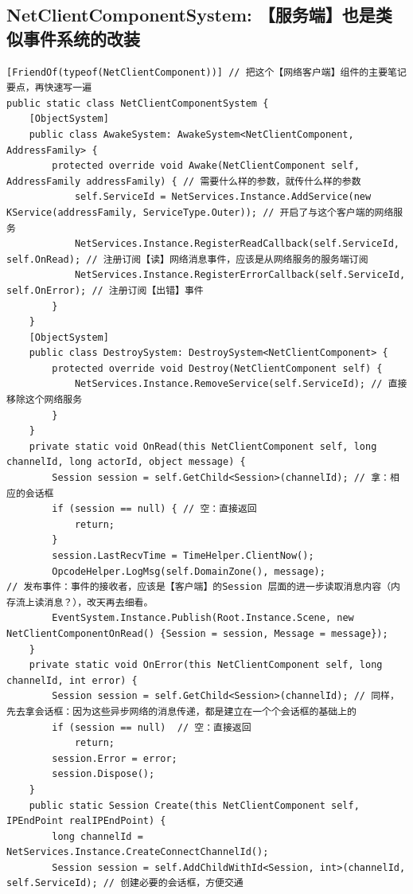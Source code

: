 \documentclass[9pt, b5paper]{article}
\begin{document}
\subsection{NetClientComponentSystem: 【服务端】也是类似事件系统的改装}
\label{sec-3-8}
\begin{verbatim}
[FriendOf(typeof(NetClientComponent))] // 把这个【网络客户端】组件的主要笔记要点，再快速写一遍
public static class NetClientComponentSystem {
    [ObjectSystem]
    public class AwakeSystem: AwakeSystem<NetClientComponent, AddressFamily> {
        protected override void Awake(NetClientComponent self, AddressFamily addressFamily) { // 需要什么样的参数，就传什么样的参数
            self.ServiceId = NetServices.Instance.AddService(new KService(addressFamily, ServiceType.Outer)); // 开启了与这个客户端的网络服务
            NetServices.Instance.RegisterReadCallback(self.ServiceId, self.OnRead); // 注册订阅【读】网络消息事件，应该是从网络服务的服务端订阅
            NetServices.Instance.RegisterErrorCallback(self.ServiceId, self.OnError); // 注册订阅【出错】事件
        }
    }
    [ObjectSystem]
    public class DestroySystem: DestroySystem<NetClientComponent> {
        protected override void Destroy(NetClientComponent self) {
            NetServices.Instance.RemoveService(self.ServiceId); // 直接移除这个网络服务
        }
    }
    private static void OnRead(this NetClientComponent self, long channelId, long actorId, object message) {
        Session session = self.GetChild<Session>(channelId); // 拿：相应的会话框
        if (session == null) { // 空：直接返回
            return;
        }
        session.LastRecvTime = TimeHelper.ClientNow();
        OpcodeHelper.LogMsg(self.DomainZone(), message);
// 发布事件：事件的接收者，应该是【客户端】的Session 层面的进一步读取消息内容（内存流上读消息？），改天再去细看。
        EventSystem.Instance.Publish(Root.Instance.Scene, new NetClientComponentOnRead() {Session = session, Message = message}); 
    }
    private static void OnError(this NetClientComponent self, long channelId, int error) {
        Session session = self.GetChild<Session>(channelId); // 同样，先去拿会话框：因为这些异步网络的消息传递，都是建立在一个个会话框的基础上的
        if (session == null)  // 空：直接返回 
            return;
        session.Error = error;
        session.Dispose();
    }
    public static Session Create(this NetClientComponent self, IPEndPoint realIPEndPoint) {
        long channelId = NetServices.Instance.CreateConnectChannelId();
        Session session = self.AddChildWithId<Session, int>(channelId, self.ServiceId); // 创建必要的会话框，方便交通

\end{verbatim}
\end{document}
